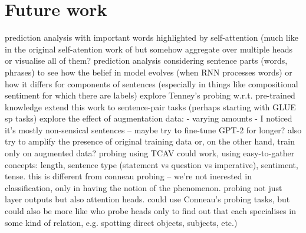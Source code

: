 \documentclass[bsc,frontabs,singlespacing,parskip,deptreport]{infthesis}
\begin{document}
\chapter{Future work}{
  prediction analysis with important words highlighted by self-attention (much like in the original self-atention work of \citet{Lin_2017} but somehow aggregate over multiple heads or visualise all of them?
  prediction analysis considering sentence parts (words, phrases) to see how the belief in model evolves (when RNN processes words) or how it differs for components of sentences (especially in things like compositional sentiment for which there are labels)
  explore Tenney's probing w.r.t. pre-trained knowledge
  extend this work to sentence-pair tasks (perhaps starting with GLUE sp tasks)
  explore the effect of augmentation data:
  - varying amounts
  - I noticed it's mostly non-sensical sentences -- maybe try to fine-tune GPT-2 for longer? also try to amplify the presence of original training data or, on the other hand, train only on augmented data?
  probing using TCAV \citep{Kim_2017} could work, using easy-to-gather concepts: length, sentence type (statement vs question vs imperative), sentiment, tense. this is different from conneau probing -- we're not inerested in classification, only in having the notion of the phenomenon.
  probing not just layer outputs but also attention heads. could use Conneau's probing tasks, but could also be more like \citet{Clark_2019} who probe heads only to find out that each specialises in some kind of relation, e.g. spotting direct objects, subjects, etc.)
}




\appendix
\end{document}
